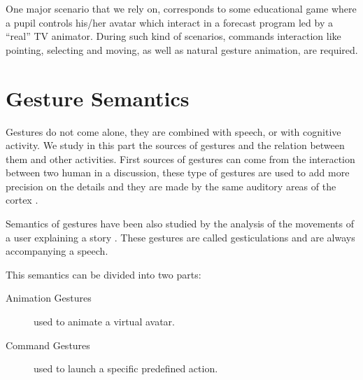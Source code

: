 \documentclass{llncs}
\newcommand\ignore[1]{}
\begin{document}
One major scenario that we rely on, corresponds to some educational game where a pupil
controls his/her avatar which interact in a forecast program led by a ``real'' TV animator.
During such kind of scenarios, commands interaction
like pointing, selecting and moving, as well as natural gesture animation, are required.

\ignore{
Its major scenario which we rely on, corresponds to educational games where a
pupil controls his/her avatar in a program led by a ``real'' TV animator.
This kind of scenarios needs to be able to manage commands interaction
like pointing, selecting and moving as well as natural gesture animation.
}

\section{Gesture Semantics}
Gestures do not come alone, they are combined with speech, or with cognitive
activity. We study in this part the sources of gestures and the relation between
them and other activities.
First sources of gestures can come from the interaction between two human in a
discussion, these type of gestures are used to add more precision on the details
and they are made by the same auditory areas of the cortex \cite{SymbolicGest}.

Semantics of gestures have been also studied by the analysis of the movements of
a user explaining a story \cite{gestureThought}.
These gestures are called gesticulations and are always accompanying a speech. 

This semantics can be divided into two parts:
\begin{description}
 \item[Animation Gestures] used to animate a virtual avatar.
 \item[Command Gestures] used to launch a specific predefined action.
\end{description}
\end{document}
